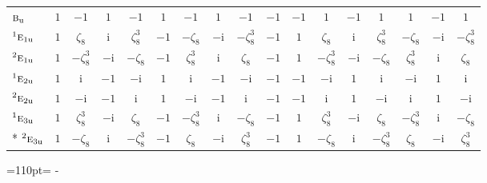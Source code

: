 \documentclass[10pt,a4paper]{article}
\newcommand{\needspace}[1]{\par\penalty-100\begingroup\dimen0=#1\relax\dimen2=\pagegoal
  \advance\dimen2-\pagetotal\ifdim\dimen0>\dimen2\relax\ifdim\dimen2>0pt\vfil\break\fi\fi
  \endgroup}
\numberwithin{equation}{section}
\newcommand{\irr}[1]{\text{\normalfont\scshape #1}}
\newcommand{\conjpair}[1]{{}^{#1}}
\newcommand{\ptag}[1]{\mathrm{#1}}
\newcommand{\iunit}{\mathrm{i}}
\newcommand{\rootunity}[1]{\zeta_{#1}}
\begin{document}
{\begin{longtable}{@{}lcccccccccccccccc@{}}
$\irr{b}_{\ptag{u}}$ & $1$ & $-1$ & $1$ & $-1$ & $1$ & $-1$ & $1$ & $-1$ & $-1$ & $-1$ & $1$ & $-1$ & $1$ & $1$ & $-1$ & $1$\\
$\conjpair{1}\irr{e}_{1\ptag{u}}$ & $1$ & $\rootunity{8}$ & $\iunit{}$ & $\rootunity{8}^{3}$ & $-1$ & $-\rootunity{8}$ & $-\iunit{}$ & $-\rootunity{8}^{3}$ & $-1$ & $1$ & $\rootunity{8}$ & $\iunit{}$ & $\rootunity{8}^{3}$ & $-\rootunity{8}$ & $-\iunit{}$ & $-\rootunity{8}^{3}$\\
$\conjpair{2}\irr{e}_{1\ptag{u}}$ & $1$ & $-\rootunity{8}^{3}$ & $-\iunit{}$ & $-\rootunity{8}$ & $-1$ & $\rootunity{8}^{3}$ & $\iunit{}$ & $\rootunity{8}$ & $-1$ & $1$ & $-\rootunity{8}^{3}$ & $-\iunit{}$ & $-\rootunity{8}$ & $\rootunity{8}^{3}$ & $\iunit{}$ & $\rootunity{8}$\\
$\conjpair{1}\irr{e}_{2\ptag{u}}$ & $1$ & $\iunit{}$ & $-1$ & $-\iunit{}$ & $1$ & $\iunit{}$ & $-1$ & $-\iunit{}$ & $-1$ & $-1$ & $-\iunit{}$ & $1$ & $\iunit{}$ & $-\iunit{}$ & $1$ & $\iunit{}$\\
$\conjpair{2}\irr{e}_{2\ptag{u}}$ & $1$ & $-\iunit{}$ & $-1$ & $\iunit{}$ & $1$ & $-\iunit{}$ & $-1$ & $\iunit{}$ & $-1$ & $-1$ & $\iunit{}$ & $1$ & $-\iunit{}$ & $\iunit{}$ & $1$ & $-\iunit{}$\\
$\conjpair{1}\irr{e}_{3\ptag{u}}$ & $1$ & $\rootunity{8}^{3}$ & $-\iunit{}$ & $\rootunity{8}$ & $-1$ & $-\rootunity{8}^{3}$ & $\iunit{}$ & $-\rootunity{8}$ & $-1$ & $1$ & $\rootunity{8}^{3}$ & $-\iunit{}$ & $\rootunity{8}$ & $-\rootunity{8}^{3}$ & $\iunit{}$ & $-\rootunity{8}$\\*
$\conjpair{2}\irr{e}_{3\ptag{u}}$ & $1$ & $-\rootunity{8}$ & $\iunit{}$ & $-\rootunity{8}^{3}$ & $-1$ & $\rootunity{8}$ & $-\iunit{}$ & $\rootunity{8}^{3}$ & $-1$ & $1$ & $-\rootunity{8}$ & $\iunit{}$ & $-\rootunity{8}^{3}$ & $\rootunity{8}$ & $-\iunit{}$ & $\rootunity{8}^{3}$\\
\bottomrule\end{longtable}}
\needspace{110pt}
\end{document}
